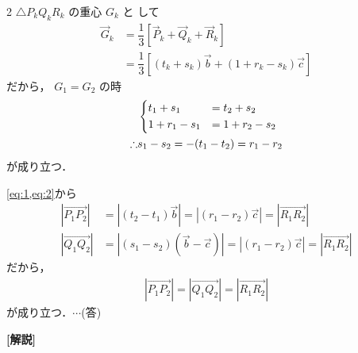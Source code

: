 \documentclass[../../main.tex]{subfiles}
\begin{document}
\begin{multicols}{2}
  $\triangle P_k Q_k R_k$ の重心 $G_k$ と して
  \begin{align}
    \vec{G}_k
    & = \dfrac{1}{3} \left[\vec{P}_k+\vec{Q}_k+\vec{R}_k\right]             \\
    & = \dfrac{1}{3} \left[ (t_k+s_k) \vec{b} + (1+r_k-s_k) \vec{c} \right]
  \end{align}
  だから， $G_1 = G_2$ の時
  \begin{align}
    &
    \begin{dcases}
      t_1+s_1   & = t_2+s_2   \\
      1+r_1-s_1 & = 1+r_2-s_2
    \end{dcases}                          \\
    \therefore
    & s_1-s_2  = -(t_1-t_2) = r_1-r_2 \label{eq:2}
  \end{align}
  が成り立つ．

  \cref{eq:1,eq:2}から
  \begin{align}
    |\overrightarrow{P_1 P_2}| & = |(t_2-t_1) \vec{b}| = |(r_1-r_2) \vec{c}| = |\overrightarrow{R_1 R_2}|         \\
    |\overrightarrow{Q_1 Q_2}| & = |(s_1-s_2)(\vec{b}-\vec{c})| = |(r_1-r_2)\vec{c}| = |\overrightarrow{R_1 R_2}|
  \end{align}
  だから，
  \begin{align}
    |\overrightarrow{P_1 P_2}| = |\overrightarrow{Q_1 Q_2}| = |\overrightarrow{R_1 R_2}|
  \end{align}
  が成り立つ．$\cdots$(答)

  {\bf [解説]}

  \newpage
\end{multicols}
\end{document}
